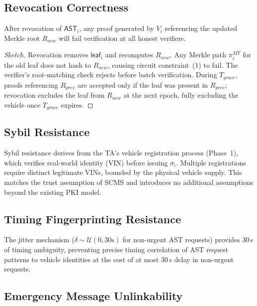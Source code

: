 \subsection{Revocation Correctness}

\begin{theorem}
After revocation of $\mathsf{AST}_i$, any proof generated by $V_i$ referencing the
updated Merkle root $R_{new}$ will fail verification at all honest verifiers.
\end{theorem}
\begin{proof}[Sketch]
Revocation removes $\mathsf{leaf}_i$ and recomputes $R_{new}$. Any Merkle path
$\pi^{MT}_i$ for the old leaf does not hash to $R_{new}$, causing circuit
constraint~(1) to fail. The verifier's root-matching check rejects before batch
verification. During $T_{grace}$, proofs referencing $R_{prev}$ are accepted only
if the leaf was present in $R_{prev}$; revocation excludes the leaf from $R_{new}$
at the next epoch, fully excluding the vehicle once $T_{grace}$ expires.
\end{proof}

\subsection{Sybil Resistance}

Sybil resistance derives from the TA's vehicle registration process (Phase~1),
which verifies real-world identity (VIN) before issuing $\sigma_i$. Multiple
registrations require distinct legitimate VINs, bounded by the physical vehicle
supply. This matches the trust assumption of SCMS and introduces no additional
assumptions beyond the existing PKI model.

\subsection{Timing Fingerprinting Resistance}

The jitter mechanism ($\delta \sim \mathcal{U}(0, 30\text{s})$ for non-urgent AST
requests) provides 30\,s of timing ambiguity, preventing precise timing correlation
of AST request patterns to vehicle identities at the cost of at most 30\,s delay
in non-urgent requests.

\subsection{Emergency Message Unlinkability}
\label{sec:emergency_security}


